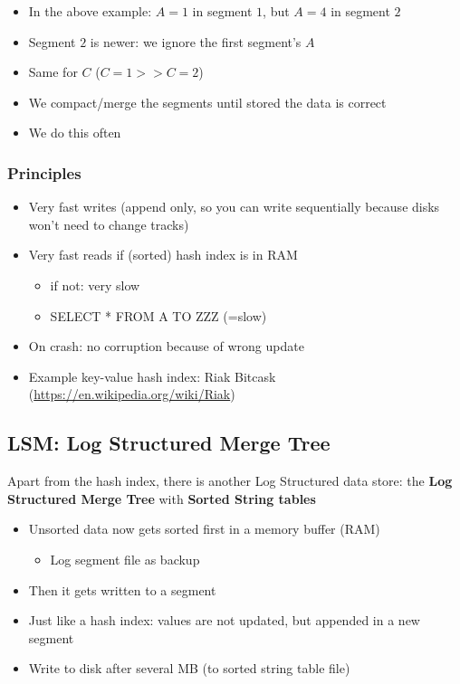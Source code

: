 \documentclass{article}
\begin{document}
\begin{itemize}
    \item In the above example: $A = 1$ in segment $1$, but $A = 4$ in segment $2$
    \item Segment $2$ is newer: we ignore the first segment's $A$
    \item Same for $C$ ($C=1 >> C=2$)
    \item We compact/merge the segments until stored the data is correct
    \item We do this often
\end{itemize}

\subsubsection{Principles}

\begin{itemize}
    \item Very fast writes (append only, so you can write sequentially because disks won't need to change tracks)
    \item Very fast reads if (sorted) hash index is in RAM
    \begin{itemize}
        \item if not: very slow
        \item SELECT * FROM A TO ZZZ (=slow)
    \end{itemize}
    \item On crash: no corruption because of wrong update
    \item Example key-value hash index: Riak Bitcask (\url{https://en.wikipedia.org/wiki/Riak})
\end{itemize}

\subsection{LSM: Log Structured Merge Tree}

Apart from the hash index, there is another Log Structured data store: the \textbf{Log Structured Merge Tree} with \textbf{Sorted String tables}

\begin{itemize}
    \item Unsorted data now gets sorted first in a memory buffer (RAM)
    \begin{itemize}
        \item Log segment file as backup
    \end{itemize}
    \item Then it gets written to a segment
    \item Just like a hash index: values are not updated, but appended in a new segment
    \item Write to disk after several MB (to sorted string table file)
\end{itemize}
\end{document}
